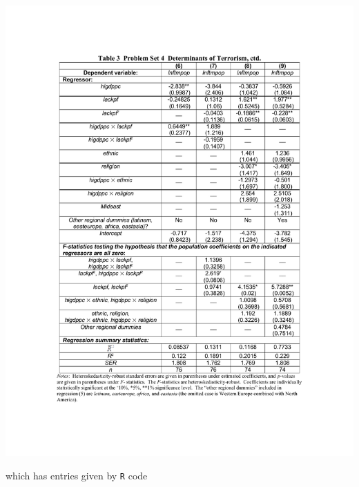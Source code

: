 \documentclass[12pt,letterpaper]{article}
\theoremstyle{definition}
\begin{document}
\begin{center}
  \includegraphics[width=\textwidth]{./figures/table3.pdf}
\end{center}
\break
which has entries given by \verb|R| code
\end{document}
